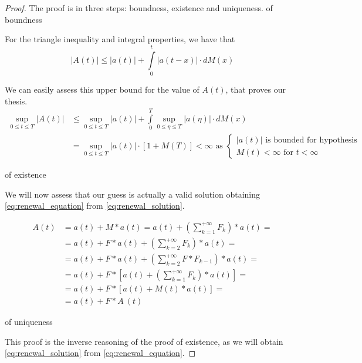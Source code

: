 \begin{proof}
	The proof is in three steps: boundness, existence and uniqueness.
	\proofpart of boundness \label{req:boundness}

	For the triangle inequality and integral properties, we have that
	$$ |A(t)| \le |a(t)| + \int\limits_0^{t}|a(t-x)| \cdot dM(x) $$

	We can easily assess this upper bound for the value of $A(t)$, that proves our thesis.
	\begin{equation}\begin{split}
		\sup_{0\le t \le T} |A(t)| & \le \sup_{0\le t \le T} |a(t)| + \int\limits_0^{T}\sup_{0\le \eta \le T}|a(\eta)| \cdot dM(x) \\
		& = \sup_{0\le t \le T} |a(t)| \cdot [ 1+M(T) ] < \infty \text{ as }
		\begin{cases}
			|a(t)| \text{ is bounded for hypothesis} \\
			M(t) < \infty \text{ for } t<\infty
		\end{cases}
	\end{split}\end{equation}

	\proofpart of existence

		We will now assess that our guess is actually a valid solution obtaining \ref{eq:renewal_equation} from \ref{eq:renewal_solution}.

		\begin{equation}\begin{split}
			A(t) &= a(t) + M \ast a(t) = a(t) + \left(\sum\limits_{k=1}^{+\infty} F_k \right) \ast a(t) = \\
			&= a(t) + F \ast a(t) +\left(\sum\limits_{k=2}^{+\infty} F_k \right) \ast a(t) = \\
			&= a(t) + F \ast a(t) +\left(\sum\limits_{k=2}^{+\infty} F \ast F_{k-1} \right) \ast a(t) = \\
			&= a(t) + F \ast \left[ a(t) + \left(\sum\limits_{k=1}^{+\infty} F_k \right) \ast a(t) \right] = \\
			&= a(t) + F \ast \left[ a(t) + M(t) \ast a(t) \right] = \\
			&=a(t) + F \ast A ~ (t)
		\end{split}\end{equation}

	\proofpart of uniqueness

	This proof is the inverse reasoning of the proof of existence, as we will obtain \ref{eq:renewal_solution} from \ref{eq:renewal_equation}.


\end{proof}
